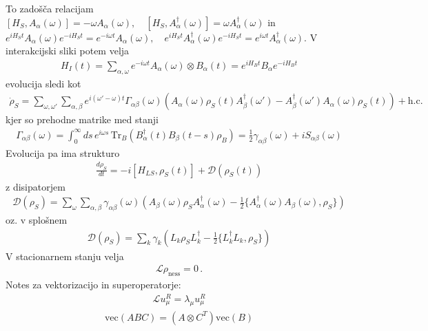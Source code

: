 \documentclass[a4paper,10pt]{article}
\begin{document}
To zadošča relacijam $[H_S, A_\alpha(\omega)] = -\omega A_\alpha(\omega), \quad [H_S, A_\alpha^\dagger(\omega)] = \omega A_\alpha^\dagger(\omega)$ in \\ $e^{i H_S t} A_\alpha(\omega) e^{-i H_S t} = e^{-i \omega t} A_\alpha(\omega), \quad e^{i H_S t} A_\alpha^\dagger(\omega) e^{-i H_S t} = e^{i \omega t} A_\alpha^\dagger(\omega)$. V interakcijski sliki potem velja
\begin{align}
  H_I(t) = \sum_{\alpha, \omega} e^{-i \omega t} A_\alpha(\omega) \otimes B_\alpha(t) = e^{i H_B t} B_\alpha e^{-i H_B t} 
\end{align}
evolucija sledi kot
\begin{align}
  \dot{\rho}_{S} = \sum_{\omega, \omega'} \sum_{\alpha, \beta} e^{i(\omega' - \omega)t} \Gamma_{\alpha\beta}(\omega) \left( A_{\alpha}(\omega) \rho_{S}(t) A_{\beta}^{\dagger}(\omega') - A_{\beta}^{\dagger}(\omega') A_{\alpha}(\omega) \rho_{S}(t) \right) + \text{h.c.}
\end{align}
kjer so prehodne matrike med stanji
\begin{align}
  \Gamma_{\alpha\beta}(\omega) = \int_{0}^{\infty} ds \, e^{i\omega s} \, \text{Tr}_{B}\left( B_{\alpha}^{\dagger}(t) B_{\beta}(t-s) \rho_{B} \right) = \frac{1}{2}\gamma_{\alpha\beta}(\omega) + i S_{\alpha\beta}(\omega)
\end{align}
Evolucija pa ima strukturo
\begin{align}
  \frac{d\rho_{S}}{dt} = -i [H_{LS}, \rho_{S}(t)] + \mathcal{D}(\rho_{S}(t))
\end{align}
z disipatorjem
\begin{align}
  \mathcal{D}(\rho_{S}) = \sum_{\omega} \sum_{\alpha,\beta} \gamma_{\alpha\beta}(\omega) \left( A_{\beta}(\omega) \rho_{S} A_{\alpha}^{\dagger}(\omega) - \frac{1}{2} \{ A_{\alpha}^{\dagger}(\omega) A_{\beta}(\omega), \rho_{S} \} \right)
\end{align}
oz. v splošnem
\begin{align}
  \mathcal{D}(\rho_{S}) = \sum_{k} \gamma_{k} \left( L_{k} \rho_{S} L_{k}^{\dagger} - \frac{1}{2} \{ L_{k}^{\dagger} L_{k}, \rho_{S} \} \right)
\end{align}
V stacionarnem stanju velja
\begin{align}
  \mathcal{L}\rho_{\text{ness}} = 0\,.
\end{align}
Notes za vektorizacijo in superoperatorje: 
\begin{align}
\mathcal{L} u_{\mu}^R = \lambda_{\mu} u_{\mu}^R
\end{align}  
\begin{align}
  \text{vec}(ABC) = (A \otimes C^T) \text{vec}(B)
\end{align}
\end{document}
